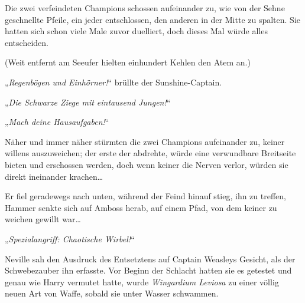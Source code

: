 Die zwei verfeindeten Champions schossen aufeinander zu, wie von der Sehne geschnellte Pfeile, ein jeder entschlossen, den anderen in der Mitte zu spalten. Sie hatten sich schon viele Male zuvor duelliert, doch dieses Mal würde alles entscheiden.

(Weit entfernt am Seeufer hielten einhundert Kehlen den Atem an.)

„\emph{Regenbögen und Einhörner!}“ brüllte der Sunshine-Captain.

„\emph{Die Schwarze Ziege mit eintausend Jungen!}“

„\emph{Mach deine Hausaufgaben!}“

Näher und immer näher stürmten die zwei Champions aufeinander zu, keiner willens auszuweichen; der erste der abdrehte, würde eine verwundbare Breitseite bieten und erschossen werden, doch wenn keiner die Nerven verlor, würden sie direkt ineinander krachen…

Er fiel geradewegs nach unten, während der Feind hinauf stieg, ihn zu treffen, Hammer senkte sich auf Amboss herab, auf einem Pfad, von dem keiner zu weichen gewillt war…

„\emph{Spezialangriff: Chaotische Wirbel!}“

Neville sah den Ausdruck des Entsetztens auf Captain Weasleys Gesicht, als der Schwebezauber ihn erfasste. Vor Beginn der Schlacht hatten sie es getestet und genau wie Harry vermutet hatte, wurde \emph{Wingardium Leviosa} zu einer völlig neuen Art von Waffe, sobald sie unter Wasser schwammen.


